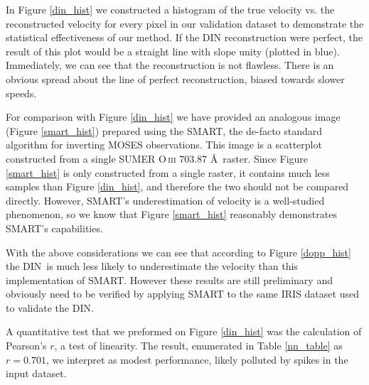 \documentclass[10pt,letterpaper]{article}
\newcommand{\SMART}{\ac{SMART}}
\newcommand{\DIN}{\ac{DIN}}
\begin{document}
				In Figure \ref{din_hist} we constructed a histogram of the true velocity vs. the reconstructed velocity for every pixel in our validation dataset to demonstrate the statistical effectiveness of our method.
				If the DIN reconstruction were perfect, the result of this plot would be a straight line with slope unity (plotted in blue).
				Immediately, we can see that the reconstruction is not flawless. 
				There is an obvious spread about the line of perfect reconstruction, biased towards slower speeds.
				
				For comparison with Figure \ref{din_hist} we have provided an analogous image (Figure \ref{smart_hist}) prepared using the \SMART, the de-facto standard algorithm for inverting MOSES observations.
				This image is a scatterplot constructed from a single SUMER O\,\textsc{iii} 703.87 \AA\ raster.
				Since Figure \ref{smart_hist} is only constructed from a single raster, it contains much less samples than Figure \ref{din_hist}, and therefore the two should not be compared directly.
				However, SMART's underestimation of velocity is a well-studied phenomenon, so we know that Figure \ref{smart_hist} reasonably demonstrates SMART's capabilities.
				
				With the above considerations we can see that according to Figure \ref{dopp_hist} the \DIN\ is much less likely to underestimate the velocity than this implementation of SMART.
				However these results are still preliminary and obviously need to be verified by applying SMART to the same IRIS dataset used to validate the DIN.
				
				A quantitative test that we preformed on Figure \ref{din_hist} was the calculation of Pearson's $r$, a test of linearity.
				The result, enumerated in Table \ref{nn_table} as $r = 0.701$, we interpret as modest performance, likely polluted by spikes in the input dataset.
			
\end{document}
